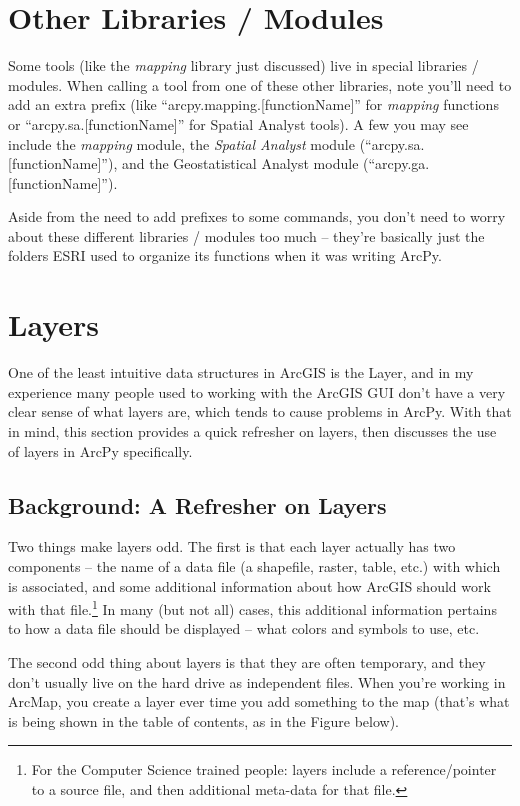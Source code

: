 \documentclass[12pt]{article}
\begin{document}
\section{Other Libraries / Modules}
Some tools (like the \emph{mapping} library just discussed) live in special libraries / modules. When calling a tool from one of these other libraries, note you'll need to add an extra prefix (like ``arcpy.mapping.[functionName]'' for \emph{mapping} functions or ``arcpy.sa.[functionName]'' for Spatial Analyst tools). A few you may see include the \emph{mapping} module, the \emph{Spatial Analyst} module (``arcpy.sa.[functionName]''), and the Geostatistical Analyst module (``arcpy.ga.[functionName]''). 

Aside from the need to add prefixes to some commands, you don't need to worry about these different libraries / modules too much -- they're basically just the folders ESRI used to organize its functions when it was writing ArcPy. 

\section{Layers}

One of the least intuitive data structures in ArcGIS is the Layer, and in my experience many people used to working with the ArcGIS GUI don't have a very clear sense of what layers are, which tends to cause problems in ArcPy. With that in mind, this section provides a quick refresher on layers, then discusses the use of layers in ArcPy specifically. 

\subsection*{Background: A Refresher on Layers}

Two things make layers odd. The first is that each layer actually has two components -- the name of a data file (a shapefile, raster, table, etc.) with which is associated, and some additional information about how ArcGIS should work with that file.\footnote{For the Computer Science trained people: layers include a reference/pointer to a source file, and then additional meta-data for that file.} In many (but not all) cases, this additional information pertains to how a data file should be displayed -- what colors and symbols to use, etc. 

The second odd thing about layers is that they are often temporary, and they don’t usually live on the hard drive as independent files. When you’re working in ArcMap, you create a layer ever time you add something to the map (that’s what is being shown in the table of contents, as in the Figure below).
\end{document}
